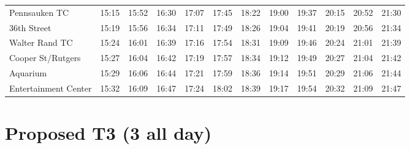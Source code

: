 \begin{center}
\begin{tabular}{@{}lrrrrrrrrrrr@{}}
Pennsauken TC & 15:15 & 15:52 & 16:30 & 17:07 & 17:45 & 18:22 & 19:00 & 19:37 & 20:15 & 20:52 & 21:30 \\
36th Street & 15:19 & 15:56 & 16:34 & 17:11 & 17:49 & 18:26 & 19:04 & 19:41 & 20:19 & 20:56 & 21:34 \\
Walter Rand TC & 15:24 & 16:01 & 16:39 & 17:16 & 17:54 & 18:31 & 19:09 & 19:46 & 20:24 & 21:01 & 21:39 \\
Cooper St/Rutgers & 15:27 & 16:04 & 16:42 & 17:19 & 17:57 & 18:34 & 19:12 & 19:49 & 20:27 & 21:04 & 21:42 \\
Aquarium & 15:29 & 16:06 & 16:44 & 17:21 & 17:59 & 18:36 & 19:14 & 19:51 & 20:29 & 21:06 & 21:44 \\
Entertainment Center & 15:32 & 16:09 & 16:47 & 17:24 & 18:02 & 18:39 & 19:17 & 19:54 & 20:32 & 21:09 & 21:47 \\
\bottomrule\end{tabular}\end{center}
\clearpage
\section{Proposed T3 (3 all day)}\label{tt:proposed_T3}
